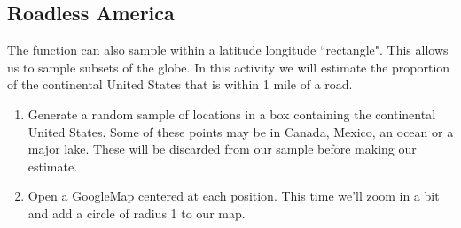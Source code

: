 \subsection{Roadless America}

The  function can also sample within a latitude longitude ``rectangle".
This allows us to sample subsets of the globe.  In this activity we will estimate 
the proportion of the continental United States that is within 1 mile of a road.

\begin{enumerate}
\item
Generate a random sample of locations in a box containing the continental United States.
Some of these points may be in Canada, Mexico, an ocean or a major lake.  These 
will be discarded from our sample before making our estimate.
\begin{knitrout}
\end{knitrout}


\item
Open a GoogleMap centered at each position.  This time we'll zoom in a bit and add 
a circle of radius 1 to our map.

\begin{knitrout}
\end{knitrout}




\end{enumerate}
